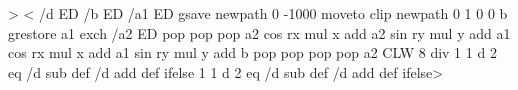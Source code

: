 >
<%
	/d ED      %
	/b ED      %
	/a1 ED     %
	gsave
	newpath
	0 -1000 moveto
	clip                  %
	newpath
	0 1 0 0 b             %
	grestore
%
	a1 exch \tx@ArcAdjust   %
	/a2 ED
	pop pop pop
	a2 cos rx mul x add
	a2 sin ry mul y add
	a1 cos rx mul x add
	a1 sin ry mul y add
	b pop pop pop pop       %
	a2 CLW 8 div
	1 1 d 2 eq { /d { sub } def } { /d { add } def } ifelse
	\tx@ArcAdjust
	1 1 d 2 eq { /d { sub } def } { /d { add } def } ifelse>  %
%

